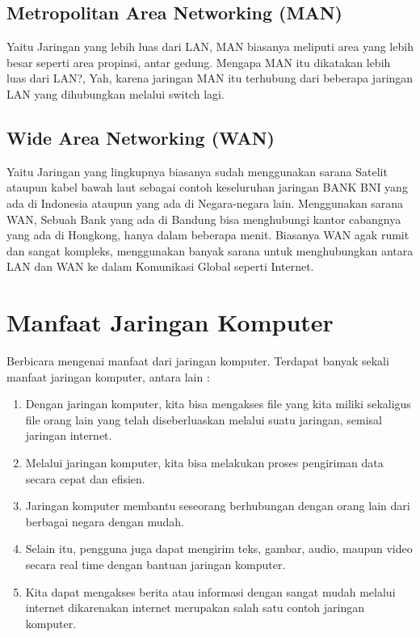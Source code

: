   \subsection{Metropolitan Area Networking (MAN)}
    Yaitu Jaringan yang lebih luas dari LAN, MAN biasanya meliputi area yang lebih besar seperti area propinsi, antar gedung. Mengapa MAN itu dikatakan lebih luas dari LAN?, Yah, karena jaringan MAN itu terhubung dari beberapa jaringan LAN yang dihubungkan melalui switch lagi.
  \subsection{Wide Area Networking (WAN)}
    Yaitu Jaringan yang lingkupnya biasanya sudah menggunakan sarana Satelit ataupun kabel bawah laut sebagai contoh keseluruhan jaringan BANK BNI yang ada di Indonesia ataupun yang ada di Negara-negara lain. Menggunakan sarana WAN, Sebuah Bank yang ada di Bandung bisa menghubungi kantor cabangnya yang ada di Hongkong, hanya dalam beberapa menit. Biasanya WAN agak rumit dan sangat kompleks, menggunakan banyak sarana untuk menghubungkan antara LAN dan WAN ke dalam Komunikasi Global seperti Internet.

\section{Manfaat Jaringan Komputer}
  Berbicara mengenai manfaat dari jaringan komputer. Terdapat banyak sekali manfaat jaringan komputer, antara lain :
    \begin{enumerate}
      \item Dengan jaringan komputer, kita bisa mengakses file yang kita miliki sekaligus file orang lain yang telah diseberluaskan melalui suatu jaringan, semisal jaringan internet.
      \item Melalui jaringan komputer, kita bisa melakukan proses pengiriman data secara cepat dan efisien.
      \item Jaringan komputer membantu seseorang berhubungan dengan orang lain dari berbagai negara dengan mudah.
      \item Selain itu, pengguna juga dapat mengirim teks, gambar, audio, maupun video secara real time dengan bantuan jaringan komputer.
      \item Kita dapat mengakses berita atau informasi dengan sangat mudah melalui internet dikarenakan internet merupakan salah satu contoh jaringan komputer.
    \end{enumerate}


